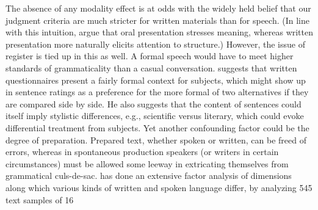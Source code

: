 The absence of any modality effect is at odds with the widely held belief that our judgment criteria are much stricter for written materials than for speech. (In line with this intuition, \citet{BialystokEtAl1985} argue that oral presentation stresses meaning, whereas written presentation more naturally elicits attention to structure.) However, the issue of register is tied up in this as well. A formal speech would have to meet higher standards of grammaticality than a casual conversation. \citet{Greenbaum1977b} suggests that written questionnaires present a fairly formal context for subjects, which might show up in sentence ratings  as a preference for the more formal of two alternatives if they are compared side by side. He also suggests \citep{Greenbaum1977c}
that the content of sentences could itself imply stylistic differences, e.g., scientific versus literary, which could evoke differential treatment from subjects. Yet another confounding factor could be the degree of preparation. Prepared text, whether spoken or written, can be freed of errors, whereas in spontaneous production speakers (or writers in certain circumstances) must be allowed some leeway in extricating themselves from grammatical culs-de-sac. \citet{Biber1986} has done an extensive factor analysis of dimensions along which various kinds of written and spoken language differ, by analyzing 545 text samples of 16
